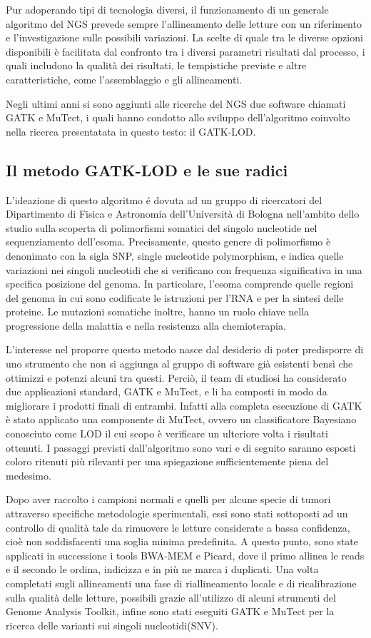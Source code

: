 Pur adoperando tipi di tecnologia diversi, il funzionamento di un generale algoritmo del NGS prevede sempre l'allineamento delle letture con un riferimento e l'investigazione sulle possibili variazioni.
La scelte di quale tra le diverse opzioni disponibili è facilitata dal confronto tra i diversi parametri risultati dal processo, i quali includono la qualità dei risultati, le tempistiche previste e altre caratteristiche, come l'assemblaggio e gli allineamenti.

Negli ultimi anni si sono aggiunti alle ricerche del NGS due software chiamati GATK e MuTect, i quali hanno condotto allo sviluppo dell'algoritmo coinvolto nella ricerca presentatata in questo testo: il GATK-LOD.


\subsection{Il metodo GATK-LOD e le sue radici}
L'ideazione di questo algoritmo é dovuta ad un gruppo di ricercatori del Dipartimento di Fisica e Astronomia dell'Università di Bologna nell'ambito dello studio sulla scoperta di polimorfismi somatici del singolo nucleotide nel sequenziamento dell'esoma.
Precisamente, questo genere di polimorfismo è denonimato con la sigla SNP, single nucleotide polymorphism, e indica quelle variazioni nei singoli nucleotidi che si verificano con frequenza significativa in una specifica posizione del genoma.
In particolare, l'esoma comprende quelle regioni del genoma in cui sono codificate le istruzioni per l'RNA e per la sintesi delle proteine.
Le mutazioni somatiche inoltre, hanno un ruolo chiave nella progressione della malattia e nella resistenza alla chemioterapia.

L'interesse nel proporre questo metodo nasce dal desiderio di poter predisporre di uno strumento che non si aggiunga al gruppo di software già esistenti bensì che ottimizzi e potenzi alcuni tra questi.
Perciò, il team di studiosi ha considerato due applicazioni standard, GATK e MuTect, e li ha composti in modo da migliorare i prodotti finali di entrambi.
Infatti alla completa esecuzione di GATK è stato applicato una componente di MuTect, ovvero un classificatore Bayesiano conosciuto come LOD il cui scopo è verificare un ulteriore volta i risultati ottenuti.
I passaggi previsti dall'algoritmo sono vari e di seguito saranno esposti coloro ritenuti più rilevanti per una spiegazione sufficientemente piena del medesimo.

Dopo aver raccolto i campioni normali e quelli per alcune specie di tumori attraverso specifiche metodologie sperimentali, essi sono stati sottoposti ad un controllo di qualità tale da rimuovere le letture considerate a bassa confidenza, cioè non soddisfacenti una soglia minima predefinita.
A questo punto, sono state applicati in successione i tools BWA-MEM e Picard, dove il primo allinea le reads e il secondo le ordina, indicizza e in più ne marca i duplicati.
Una volta completati sugli allineamenti una fase di riallineamento locale e di ricalibrazione sulla qualità delle letture, possibili grazie all'utilizzo di alcuni strumenti del Genome Analysis Toolkit, infine sono stati eseguiti GATK e MuTect per la ricerca delle varianti sui singoli nucleotidi(SNV).


